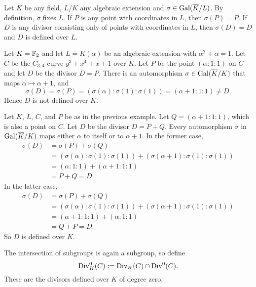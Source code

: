 \begin{example}
  Let $K$ be any field, $L/K$ any algebraic extension and $\sigma \in \operatorname{Gal}(\overline K/L)$.
  By definition, $\sigma$ fixes $L$.
  If $P$ is any point with coordinates in $L$, then $\sigma(P) = P$.
  If $D$ is any divisor consisting only of points with coordinates in $L$, then $\sigma(D) = D$ and $D$ is defined over $L$.
\end{example}
\begin{example}
  Let $K = \mathbb{F}_2$ and let $L = K(\alpha)$ be an algebraic extension with $\alpha^2 + \alpha = 1$.
  Let $C$ be the $C_{3,4}$ curve $y^3 + x^4 + x + 1$ over $K$.
  Let $P$ be the point $(\alpha : 1 : 1)$ on $C$ and let $D$ be the divisor $D = P$.
  There is an automorphism $\sigma \in \operatorname{Gal}(\overline K/K)$ that maps $\alpha \mapsto \alpha + 1$, and
    \[ \sigma(D) = \sigma(P) = (\sigma(\alpha) : \sigma(1) : \sigma(1)) = (\alpha + 1 : 1 : 1) \neq D. \]
  Hence $D$ is not defined over $K$.
\end{example}
\begin{example}
  \label{ex_defined_over_k}
  Let $K$, $L$, $C$, and $P$ be as in the previous example.
  Let $Q = (\alpha + 1 : 1 : 1)$, which is also a point on $C$.
  Let $D$ be the divisor $D = P + Q$.
  Every automorphism $\sigma$ in $\operatorname{Gal}(\overline K/K)$ maps either $\alpha$ to itself or to $\alpha + 1$.
  In the former case,
  \begin{align*}
    \sigma(D) &= \sigma(P) + \sigma(Q) \\
              &= (\sigma(\alpha) : \sigma(1) : \sigma(1)) + (\sigma(\alpha + 1) : \sigma(1) : \sigma(1)) \\
              &= (\alpha : 1 : 1) + (\alpha + 1 : 1 : 1) \\
              &= P + Q = D.
  \end{align*}
  In the latter case,
  \begin{align*}
    \sigma(D) &= \sigma(P) + \sigma(Q) \\
              &= (\sigma(\alpha) : \sigma(1) : \sigma(1)) + (\sigma(\alpha + 1) : \sigma(1) : \sigma(1)) \\
              &= (\alpha + 1 : 1 : 1) + (\alpha : 1 : 1) \\
              &= Q + P = D.
  \end{align*}
  So $D$ is defined over $K$.
\end{example}

The intersection of subgroups is again a subgroup, so define
  \[ \operatorname{Div}_K^0(C) := \operatorname{Div}_K(C) \cap \operatorname{Div}^0(C). \]
These are the divisors defined over $K$ of degree zero.

